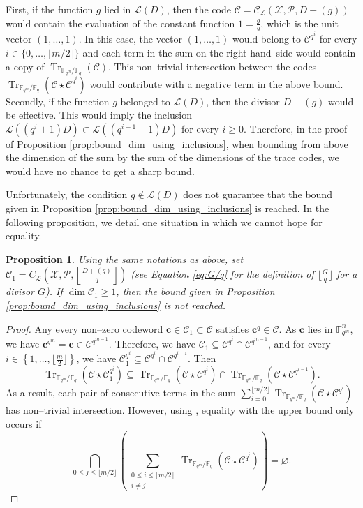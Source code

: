 \documentclass[a4paper]{article}
\newtheorem{proposition}[thm]{Proposition}
\theoremstyle{definition}
\theoremstyle{remark}
\newcommand{\calP}{\mathcal{P}}
\newcommand{\calL}{\mathcal{L}}
\newcommand{\calC}{\mathcal{C}}
\newcommand{\calX}{\mathcal{X}}
\newcommand{\fqm}{\mathbb{F}_{q^m}}
\newcommand{\fq}{\mathbb{F}_{q}}
\newcommand{\Tr}[1]{\operatorname{Tr}_{\mathbb{F}_{q^m}/\fq}\left(#1\right)}
\newcommand{\set}[1]{\left\{#1\right\}}
\begin{document}
First, if the function $g$ lied in $\calL(D)$, then the code $\calC= \calC_{\calL}(\calX,\calP,D+(g))$ would contain the evaluation of the constant function $1=\frac{g}{g}$, which is the unit vector $(1,\dots,1)$. In this case, the vector $(1,\dots,1)$ would belong to $\calC^{q^i}$ for every $i \in \{0,\dots, \lfloor{m/2} \rfloor\}$ and each term in the sum on the right hand--side would contain a copy of $\Tr{\calC}$. This non--trivial intersection between the codes $\Tr{\calC\star \calC^{q^i}}$ would contribute with a negative term in the above bound.
Secondly, if the function $g$ belonged to $\calL(D)$, then the divisor $D+(g)$ would be effective. This would imply the inclusion $\calL((q^i+1)D) \subset \calL((q^{i+1}+1)D)$ for every $i \geq 0$. Therefore, in the proof of Proposition \ref{prop:bound_dim_using_inclusions}, when bounding from above the dimension of the sum by the sum of the dimensions of the trace codes, we would have no chance to get a sharp bound.

Unfortunately, the condition $g \notin \calL(D)$ does not guarantee that the bound given in Proposition \ref{prop:bound_dim_using_inclusions} is reached. In the following proposition, we detail one situation in which we cannot hope for equality.

\begin{proposition}\label{prop:non-eq}
	Using the same notations as above, set $\calC_1=C_{\calL}(\calX,\mathcal{P},\left\lfloor \frac{D+(g)}{q} \right\rfloor)$ (see Equation \eqref{eq:G/q} for the definition of $\lfloor \frac{G}{q} \rfloor$ for a divisor $G$). If $\dim \calC_1 \geq 1$, then the bound given in Proposition \ref{prop:bound_dim_using_inclusions} is not reached.
\end{proposition}

\begin{proof}
Any every non--zero codeword $\mathbf{c} \in  \calC_1 \subset \calC$ satisfies $\mathbf{c}^q \in \calC$. As $\mathbf{c}$ lies in $\fqm^n$, we have $\mathbf{c}^{q^m}=\mathbf{c} \in \calC^{q^{m-1}}$. Therefore,  we have $\calC_1 \subseteq \calC^{q^i} \cap \calC^{q^{m-1}}$, and for every $i \in \set{1,\dots,\lfloor \frac{m}{2}\rfloor}$, we have $\calC_1^{q^i} \subseteq \calC^{q^i} \cap \calC^{q^{i-1}}$. Then
\[\Tr{\calC\star\calC_1^{q^i}} \subseteq \Tr{\calC\star\calC^{q^i}} \cap \Tr{\calC\star\calC^{q^{i-1}}}.\]
As a result, each pair of consecutive terms in the sum $\sum\limits_{i=0}^{\lfloor m/2 \rfloor} \Tr{\calC \star \calC^{q^i}}$ has non--trivial intersection. However, using \cite[Theorem~2]{T19}, equality with the upper bound only occurs if
\[\bigcap_{0\leq j \leq \lfloor m/2\rfloor} \left( \sum_{\substack{0\leq i \leq \lfloor m/2 \rfloor\\ i\neq j}} \Tr{\calC \star \calC^{q^i}} \right)= \varnothing.\]
\end{proof}
\end{document}
